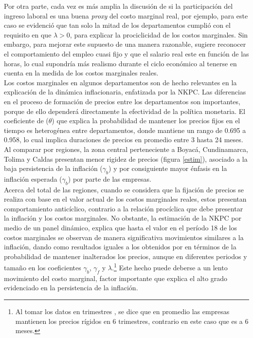 Por otra parte, cada vez es más amplia la discusión de si la participación del ingreso laboral es una buena \textit{proxy} del costo marginal real, por ejemplo, para este caso se evidenció que tan solo la mitad de los departamentos cumplió con el requisito en que $\lambda>0$, para explicar la prociclicidad de los costos marginales. Sin embargo, para mejorar este supuesto de una manera razonable, \cite{mazumder2010new} sugiere reconocer el comportamiento del empleo cuasi fijo y que el salario real este en  función de las horas, lo cual supondría más realismo durante el ciclo económico al tenerse en cuenta en la medida de los costos marginales reales.  \\

Los costos marginales en algunos departamentos son de hecho relevantes en la explicación de la dinámica inflacionaria, enfatizada por la NKPC. Las diferencias en el proceso de formación de precios entre los departamentos son importantes, porque de ello dependerá directamente la efectividad de la política monetaria. El coeficiente de \cite{calvo1983staggered} ($\theta$)  que explica la probabilidad de mantener los precios fijos en el tiempo es heterogénea entre departamentos, donde mantiene un rango de 0.695 a 0.958, lo cual implica duraciones de precios en promedio entre 3 hasta 24 meses.  Al comparar por regiones, la zona central perteneciente a Boyacá, Cundinamarca, Tolima y Caldas presentan menor rigidez de precios (figura \ref{estim}), asociado a la baja persistencia de la inflación ($\gamma_{b}$) y por consiguiente mayor énfasis en la inflación esperada ($\gamma_{b}$) por parte de las empresas. \\

Acerca del total de las regiones, cuando se considera que la fijación de precios se realiza con base en el valor actual de los costos marginales reales, estos presentan comportamiento anticíclico, contrario a la relación procíclica que debe presentar la inflación y los costos marginales. No obstante, la estimación de la NKPC por medio de un panel dinámico, explica que hasta el valor en el período 18 de los costos marginales se observan de manera significativa movimientos similares a la inflación, dando como resultados iguales a los obtenidos por \cite{galvis2010estimacion} en términos de la probabilidad de mantener inalterados los precios, aunque en diferentes periodos y tamaño en los coeficientes $\gamma_{b}$, $\gamma_{f}$ y $\lambda$.\footnote{Al tomar los datos en trimestres \cite{galvis2010estimacion}, se dice que en promedio las empresas mantienen los precios rígidos en 6 trimestres, contrario en este caso que es a 6 meses.} Este hecho puede deberse a un lento movimiento del costo marginal, factor  importante que explica el alto grado evidenciado en la persistencia de la inflación.
 


